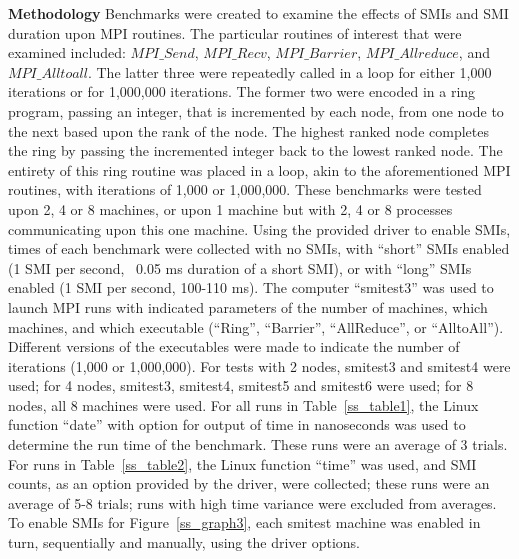 \documentclass{IEEEtran}
\begin{document}
\textbf{Methodology}
Benchmarks were created to examine the effects of SMIs and SMI duration upon MPI routines. The particular routines of interest that were examined included: $MPI\_Send$, $MPI\_Recv$, $MPI\_Barrier$, $MPI\_Allreduce$, and $MPI\_Alltoall$. The latter three were repeatedly called in a loop for either 1,000 iterations or for 1,000,000 iterations. The former two were encoded in a ring program, passing an integer, that is incremented by each node, from one node to the next based upon the rank of the node. The highest ranked node completes the ring by passing the incremented integer back to the lowest ranked node. The entirety of this ring routine was placed in a loop, akin to the aforementioned MPI routines, with iterations of 1,000 or 1,000,000. These benchmarks were tested upon 2, 4 or 8 machines, or upon 1 machine but with 2, 4 or 8 processes communicating upon this one machine. Using the provided driver to enable SMIs, times of each benchmark were collected with no SMIs, with “short” SMIs enabled (1 SMI per second, ~0.05 ms duration of a short SMI), or with “long” SMIs enabled (1 SMI per second, 100-110 ms). The computer “smitest3” was used to launch MPI runs with indicated parameters of the number of machines, which machines, and which executable (“Ring”, “Barrier”, “AllReduce”, or “AlltoAll”). Different versions of the executables were made to indicate the number of iterations (1,000 or 1,000,000). For tests with 2 nodes, smitest3 and smitest4 were used; for 4 nodes, smitest3, smitest4, smitest5 and smitest6 were used; for 8 nodes, all 8 machines were used. For all runs in Table~\ref{ss_table1}, the Linux function “date” with option for output of time in nanoseconds was used to determine the run time of the benchmark. These runs were an average of 3 trials. For runs in Table~\ref{ss_table2}, the Linux function “time” was used, and SMI counts, as an option provided by the driver, were collected; these runs were an average of 5-8 trials; runs with high time variance were excluded from averages. To enable SMIs for Figure~\ref{ss_graph3}, each smitest machine was enabled in turn, sequentially and manually, using the driver options.
\end{document}
